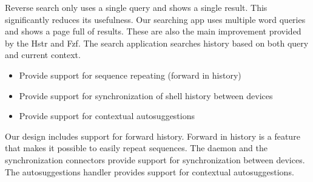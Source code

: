 Reverse search only uses a single query and shows a single result. This significantly reduces its usefulness. Our searching app uses multiple word queries and shows a page full of results. These are also the main improvement provided by the Hstr and Fzf.
The search application searches history based on both query and current context.

\begin{itemize}
\item Provide support for sequence repeating (forward in history)
\item Provide support for synchronization of shell history between devices
\item Provide support for contextual autosuggestions
\end{itemize}

Our design includes support for forward history. Forward in history is a feature that makes it possible to easily repeat sequences. 
The daemon and the synchronization connectors provide support for synchronization between devices. The autosuggestions handler provides support for contextual autosuggestions.

